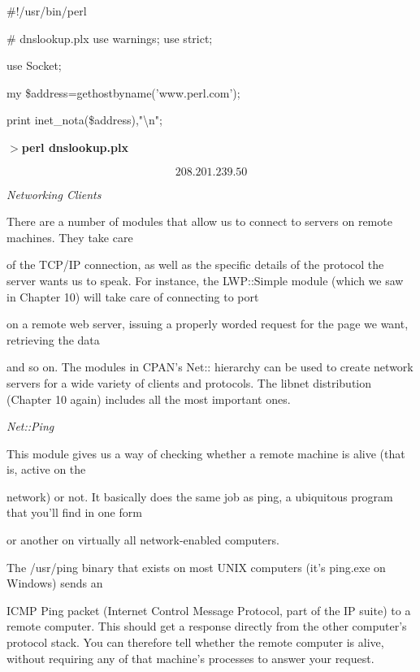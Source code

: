 \documentclass[a4paper,11pt]{book}
\begin{document}
\noindent 

\noindent \#!/usr/bin/perl

\noindent \# dnslookup.plx use warnings; use strict;

\noindent use Socket;

\noindent my \$address=gethostbyname('www.perl.com');

\noindent print inet\_nota(\$address),"\textbackslash n";

\noindent 

\noindent $>$\textbf{perl dnslookup.plx}

\[208.201.239.50\] 


\noindent \textit{Networking Clients}

\noindent There are a number of modules that allow us to connect to servers on remote machines. They take care

\noindent of the TCP/IP connection, as well as the specific details of the protocol the server wants us to speak. For instance, the LWP::Simple module (which we saw in Chapter 10) will take care of connecting to port

 on a remote web server, issuing a properly worded request for the page we want, retrieving the data

\noindent and so on. The modules in CPAN's Net:: hierarchy can be used to create network servers for a wide variety of clients and protocols. The libnet distribution (Chapter 10 again) includes all the most important ones.

\noindent 

\noindent \textit{Net::Ping}

\noindent This module gives us a way of checking whether a remote machine is alive (that is, active on the

\noindent network) or not. It basically does the same job as ping, a ubiquitous program that you'll find in one form

\noindent or another on virtually all network-enabled computers.

\noindent 

\noindent 

\noindent The /usr/ping binary that exists on most UNIX computers (it's ping.exe on Windows) sends an

\noindent ICMP Ping packet (Internet Control Message Protocol, part of the IP suite) to a remote computer. This should get a response directly from the other computer's protocol stack. You can therefore tell whether the remote computer is alive, without requiring any of that machine's processes to answer your request.
\end{document}

